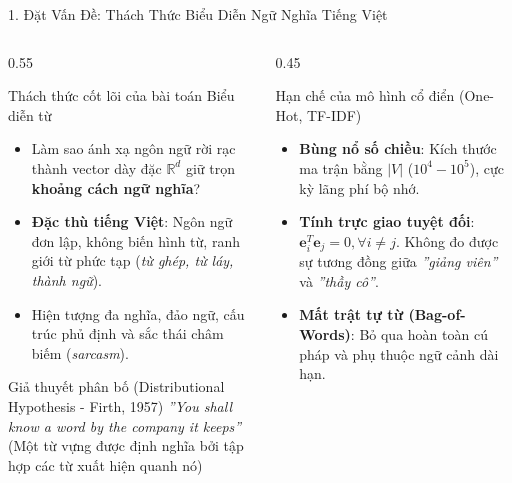 \documentclass[aspectratio=169, 10pt]{beamer}
\begin{document}
\begin{frame}{1. Đặt Vấn Đề: Thách Thức Biểu Diễn Ngữ Nghĩa Tiếng Việt}
  \begin{columns}[c]
    \begin{column}{0.55\textwidth}
      \begin{block}{Thách thức cốt lõi của bài toán Biểu diễn từ}
        \fontsize{7.5}{9.5}\selectfont
        \begin{itemize}
          \item Làm sao ánh xạ ngôn ngữ rời rạc thành vector dày đặc $\mathbb{R}^d$ giữ trọn \textbf{khoảng cách ngữ nghĩa}?
          \item \textbf{Đặc thù tiếng Việt}: Ngôn ngữ đơn lập, không biến hình từ, ranh giới từ phức tạp (\textit{từ ghép, từ láy, thành ngữ}).
          \item Hiện tượng đa nghĩa, đảo ngữ, cấu trúc phủ định và sắc thái châm biếm (\textit{sarcasm}).
        \end{itemize}
      \end{block}
      \vspace{0.1cm}
      \begin{exampleblock}{Giả thuyết phân bố (Distributional Hypothesis - Firth, 1957)}
        \centering\fontsize{8}{10}\selectfont
        \textit{''You shall know a word by the company it keeps''}\\
        (Một từ vựng được định nghĩa bởi tập hợp các từ xuất hiện quanh nó)
      \end{exampleblock}
    \end{column}
    \begin{column}{0.45\textwidth}
      \begin{alertblock}{Hạn chế của mô hình cổ điển (One-Hot, TF-IDF)}
        \fontsize{7.5}{9.5}\selectfont
        \begin{itemize}
          \item \textbf{Bùng nổ số chiều}: Kích thước ma trận bằng $|V|$ ($10^4 - 10^5$), cực kỳ lãng phí bộ nhớ.
          \item \textbf{Tính trực giao tuyệt đối}: $\mathbf{e}_i^T \mathbf{e}_j = 0, \forall i \ne j$. Không đo được sự tương đồng giữa \textit{''giảng viên''} và \textit{''thầy cô''}.
          \item \textbf{Mất trật tự từ (Bag-of-Words)}: Bỏ qua hoàn toàn cú pháp và phụ thuộc ngữ cảnh dài hạn.
        \end{itemize}
      \end{alertblock}
    \end{column}
  \end{columns}
\end{frame}
\end{document}
